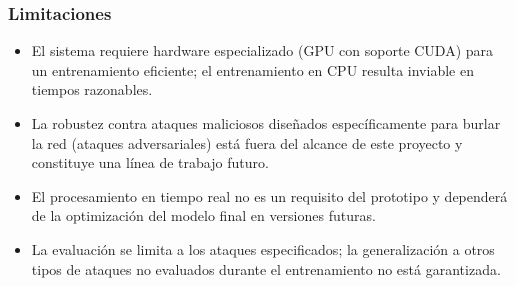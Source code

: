 \subsubsection{Limitaciones}
\label{subsec:limitaciones}

\begin{itemize}
    \item El sistema requiere hardware especializado (GPU con soporte CUDA) para un entrenamiento eficiente; el entrenamiento en CPU resulta inviable en tiempos razonables.
    \item La robustez contra ataques maliciosos diseñados específicamente para burlar la red (ataques adversariales) está fuera del alcance de este proyecto y constituye una línea de trabajo futuro.
    \item El procesamiento en tiempo real no es un requisito del prototipo y dependerá de la optimización del modelo final en versiones futuras.
    \item La evaluación se limita a los ataques especificados; la generalización a otros tipos de ataques no evaluados durante el entrenamiento no está garantizada.
\end{itemize}
